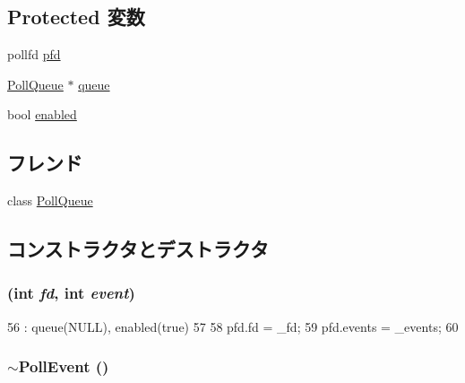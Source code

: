 \subsection*{Protected 変数}
\begin{DoxyCompactItemize}
\item 
pollfd \hyperlink{classPollEvent_ae6c60b22ef902803b43cab37d21290a2}{pfd}
\item 
\hyperlink{classPollQueue}{PollQueue} $\ast$ \hyperlink{classPollEvent_a4d805f3ad1c8fec3eebbc665ddab7619}{queue}
\item 
bool \hyperlink{classPollEvent_a8740ba80e30dd75e71d09fa1dcf04f3d}{enabled}
\end{DoxyCompactItemize}
\subsection*{フレンド}
\begin{DoxyCompactItemize}
\item 
class \hyperlink{classPollEvent_a038a8fd0c5373555638bb67fab4a6d63}{PollQueue}
\end{DoxyCompactItemize}


\subsection{コンストラクタとデストラクタ}
\hypertarget{classPollEvent_aee8ae64a16b532669d397d37557c4948}{
\subsubsection[{PollEvent}]{ (int {\em fd}, \/  int {\em event})}}
\label{classPollEvent_aee8ae64a16b532669d397d37557c4948}



\begin{DoxyCode}
56     : queue(NULL), enabled(true)
57 {
58     pfd.fd = _fd;
59     pfd.events = _events;
60 }
\end{DoxyCode}
\hypertarget{classPollEvent_a98273ac625d58f5f80808cf543a4dc18}{
\subsubsection[{$\sim$PollEvent}]{\setlength{\rightskip}{0pt plus 5cm}$\sim${\bf PollEvent} ()}}
\label{classPollEvent_a98273ac625d58f5f80808cf543a4dc18}



